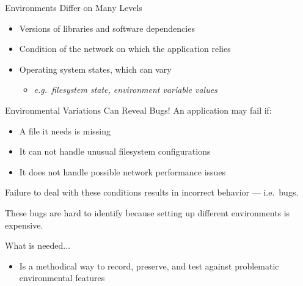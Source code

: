 \documentclass[pdf]{beamer}
\begin{document}
\begin{frame}{Environments Differ on Many Levels}
  \begin{itemize}
    \item{Versions of libraries and software dependencies}
    \item{Condition of the network on which the application relies}
    \item{Operating system states, which can vary}
      \begin{itemize}
        \item{\textit{e.g.\ filesystem state, environment variable values}}
      \end{itemize}
  \end{itemize}
\end{frame}


\begin{frame}{Environmental Variations Can Reveal Bugs!}
  An application may fail if:
  \begin{itemize}
    \item{A file it needs is missing}
    \item{It can not handle unusual filesystem configurations}
    \item{It does not handle possible network performance issues}

  \end{itemize}
  Failure to deal with these conditions results in incorrect behavior --- i.e.\ bugs.

  These bugs are hard to identify because setting up different environments is
  expensive.
\end{frame}


\begin{frame}{What is needed...}
  \begin{itemize}
    \item{Is a methodical way to record, preserve, and test against
      problematic environmental features}
  \end{itemize}
\end{frame}


\end{document}
